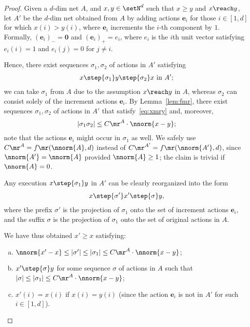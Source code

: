 \begin{proof}
Given a $d$-dim net $A$, and $x,y\in\setN^d$ such that $x\geq y$ and $x\reach y$,
	let $A'$ be 
the $d$-dim net obtained from $A$ by adding actions
	$\mathbf{e}_i$ for those $i\in[1,d]$ for which $x(i)>y(i)$, where $\mathbf{e}_i$
increments the
	$i$-th component by $1$.
	Formally,
	$(\mathbf{e}_i)_-=\mathbf{0}$ and $(\mathbf{e}_i)_+=e_i$,
	where $e_i$
is the $i$th unit vector satisfying
	$e_i(i)=1$ and $e_i(j)=0$ for 
	$j\neq i$.

Hence, there exist sequences $\sigma_1,\sigma_2$ of actions in $A'$
	satisfying
	\begin{equation}\label{eq:xmry}
	x\step{\sigma_1}y\step{\sigma_2}x\text{ in }A';
	\end{equation}
we can take $\sigma_1$ from $A$ due to the assumption $x\reach y$ in $A$,
whereas $\sigma_2$ can consist solely of the increment actions $\mathbf{e}_i$.
	By Lemma~\ref{lem:fmr}, there exist sequences
	$\sigma_1,\sigma_2$  of actions in $A'$
	that satisfy~\eqref{eq:xmry} and, moreover,
	\[|\sigma_1\sigma_2|\leq C\mr^A\cdot
\nnorm{x-y};\]
note that the actions $\mathbf{e}_i$ might occur
	in $\sigma_1$ as well. We safely use $C\mr^A=f\mr(\nnorm{A},d)$ instead of
	$C\mr^{A'}=f\mr(\nnorm{A'},d)$, since $\nnorm{A'}=\nnorm{A}$
	provided $\nnorm{A}\geq 1$; the claim is trivial if
	$\nnorm{A}=0$.

Any execution $x\step{\sigma_1}y$ in $A'$ can be clearly reorganized
	into the form 
	\[x\step{\sigma'}x'\step{\sigma}y,\] 
where 
the prefix $\sigma'$ is the projection of $\sigma_1$ onto
	the  set 
of increment actions $\mathbf{e}_i$, and
the suffix $\sigma$ is the projection of $\sigma_1$ onto
	the   set of original 
 actions in $A$.

	We have
	thus obtained $x'\geq x$ satisfying:
	\begin{enumerate}[a)]	
		\item $\nnorm{x'-x}\leq |\sigma'|\leq |\sigma_1|\leq C\mr^A\cdot \nnorm{x-y}$; 
		\item
			$x'\step{\sigma}y$ for some sequence $\sigma$ of actions in $A$
			such that $|\sigma|\leq |\sigma_1|\leq C\mr^A\cdot
			\nnorm{x-y}$;
	\item $x'(i)=x(i)$ if $x(i)=y(i)$ (since the action
		$\mathbf{e}_i$ is not in $A'$ for such $i\in[1,d]$).
			\qedhere
	\end{enumerate}
\end{proof}

